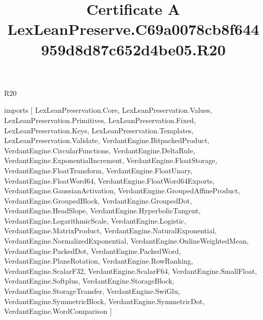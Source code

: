 \begin{lexlean}{R20}
\title{Certificate A LexLeanPreserve.C69a0078cb8f644959d8d87c652d4be05.R20}
\begin{coremodule}
imports [
  LexLeanPreservation.Core,
  LexLeanPreservation.Values,
  LexLeanPreservation.Primitives,
  LexLeanPreservation.Fixed,
  LexLeanPreservation.Keys,
  LexLeanPreservation.Templates,
  LexLeanPreservation.Validate,
  VerdantEngine.BitpackedProduct,
  VerdantEngine.CircularFunctions,
  VerdantEngine.DeltaRule,
  VerdantEngine.ExponentialIncrement,
  VerdantEngine.FloatStorage,
  VerdantEngine.FloatTransform,
  VerdantEngine.FloatUnary,
  VerdantEngine.FloatWord64,
  VerdantEngine.FloatWord64Exports,
  VerdantEngine.GaussianActivation,
  VerdantEngine.GroupedAffineProduct,
  VerdantEngine.GroupedBlock,
  VerdantEngine.GroupedDot,
  VerdantEngine.HeadSlope,
  VerdantEngine.HyperbolicTangent,
  VerdantEngine.LogarithmicScale,
  VerdantEngine.Logistic,
  VerdantEngine.MatrixProduct,
  VerdantEngine.NaturalExponential,
  VerdantEngine.NormalizedExponential,
  VerdantEngine.OnlineWeightedMean,
  VerdantEngine.PackedDot,
  VerdantEngine.PackedWord,
  VerdantEngine.PlaneRotation,
  VerdantEngine.RowRanking,
  VerdantEngine.ScalarF32,
  VerdantEngine.ScalarF64,
  VerdantEngine.SmallFloat,
  VerdantEngine.Softplus,
  VerdantEngine.StorageBlock,
  VerdantEngine.StorageTransfer,
  VerdantEngine.SwiGlu,
  VerdantEngine.SymmetricBlock,
  VerdantEngine.SymmetricDot,
  VerdantEngine.WordComparison
]


\end{coremodule}
\end{lexlean}
